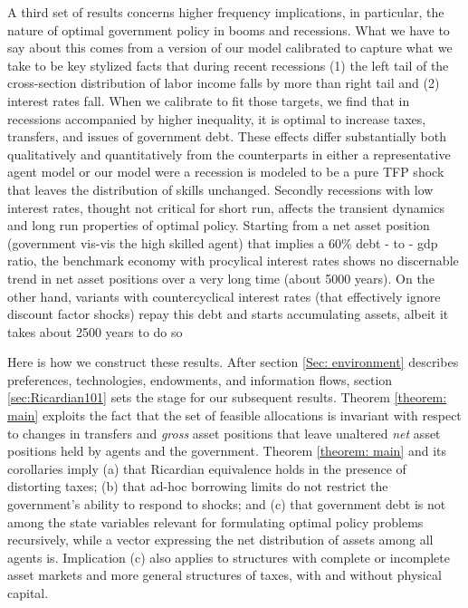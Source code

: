 \documentclass[thmsb,11pt]{article}
\begin{document}
A third set of results concerns higher frequency implications, in particular,  the nature of  optimal government policy in booms and recessions.
What we have to say about this comes from a  version of our model calibrated to capture what we take to be
key  stylized facts  that during recent recessions  (1) the left tail of the cross-section distribution of labor income falls by more than right tail and (2) interest rates fall. When we calibrate  to fit those targets, we find that in recessions accompanied by higher inequality, it is  optimal to increase taxes, transfers, and issues of
 government debt. %
These effects differ substantially both qualitatively and quantitatively from the counterparts in either a representative agent model or our model were a  recession is modeled to be a pure TFP shock that leaves the distribution of skills unchanged. Secondly recessions with low interest rates, thought not critical for short run, affects the transient dynamics and long run properties of optimal policy. Starting from a net asset position (government vis-vis the high skilled agent) that implies a 60\% debt - to - gdp ratio, the benchmark economy with procylical interest rates shows no discernable trend in net asset positions over a very long time (about 5000 years). On the other hand, variants with countercyclical interest rates  (that effectively ignore discount factor shocks) repay this debt and starts accumulating assets, albeit it takes about 2500 years to do so



Here is how we construct these results.
After section \ref{Sec: environment} describes preferences, technologies, endowments, and
information flows, section
\ref{sec:Ricardian101} sets the stage for our subsequent results. Theorem \ref{theorem: main}
exploits the fact that the set of feasible allocations is invariant with respect to changes in transfers and \emph{gross} asset positions that leave
unaltered  \emph{net} asset positions held by agents and the government.  Theorem \ref{theorem: main} and its corollaries imply (a) that Ricardian equivalence holds in the presence of
distorting  taxes; (b) that ad-hoc borrowing limits do not restrict the government's ability to respond to shocks; and (c) that government debt
is not among the  state variables relevant for formulating  optimal policy problems recursively, while a vector expressing the net distribution of assets among all agents is.
Implication (c) also applies to structures with complete or incomplete asset markets
and more general structures of taxes, with and without physical
capital.  %
\end{document}
